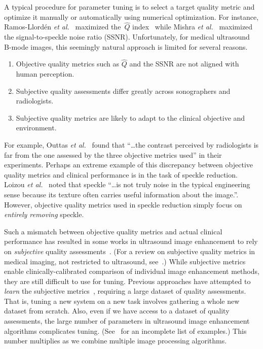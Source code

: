 A typical procedure for parameter tuning is to select a target quality metric and optimize it manually or automatically using numerical optimization.
For instance, Ramos-Llord\'en \textit{et al.}~\cite{ramos-llorden_anisotropic_2015} maximized the~\(\widehat{Q}\) index~\cite{tay_ultrasound_2006} while Mishra \textit{et al.}~\cite{mishra_edge_2018} maximized the signal-to-speckle noise ratio (SSNR).
Unfortunately, for medical ultrasound B-mode images, this seemingly natural approach is limited for several reasons.
\vspace{0.05in}
\begin{enumerate}
  \item[\ding{228}] Objective quality metrics such as \(\widehat{Q}\) and the SSNR are not aligned with human perception.
    \vspace{0.05in}
  \item[\ding{228}] Subjective quality assessments differ greatly across sonographers and radiologists.
    \vspace{0.05in}
  \item[\ding{228}] Subjective quality metrics are likely to adapt to the clinical objective and environment.
\end{enumerate}
For example, Outtas \textit{et al.}~\cite{outtas_subjective_2018} found that ``\ldots the contrast perceived by radiologists is far from the one assessed by the three objective metrics used'' in their experiments.
Perhaps an extreme example of this discrepancy between objective quality metrics and clinical performance is in the task of speckle reduction.
Loizou \textit{et al.}~\cite{loizou_comparative_2005} noted that speckle ``\ldots is not truly noise in the typical engineering sense because its texture often carries useful information about the image.''.
However, objective quality metrics used in speckle reduction simply focus on \textit{entirely removing} speckle.

Such a mismatch between objective quality metrics and actual clinical performance has resulted in some works in ultrasound image enhancement to rely on \textit{subjective} quality assessments~\cite{loizou_quality_2006, hemmsen_ultrasound_2010, wong_monte_2012, kang_new_2016, mishra_edge_2018}.
(For a review on subjective quality metrics in medical imaging, not restricted to ultrasound, see~\cite{chow_review_2016}.)
While subjective metrics enable clinically-calibrated comparison of individual image enhancement methods, they are still difficult to use for tuning.
Previous approaches have attempted to \textit{learn} the subjective metrics~\cite{el-zehiry_learning_2013, abdi_automatic_2017, annangi_ai_2020}, requiring a large dataset of quality assessments.
That is, tuning a new system on a new task involves gathering a whole new dataset from scratch.
Also, even if we have access to a dataset of quality assessments, the large number of parameters in ultrasound image enhancement algorithms complicates tuning.
(See~\cite[Table 5]{finn_echocardiographic_2011} for an incomplete list of examples.)
This number multiplies as we combine multiple image processing algorithms.

